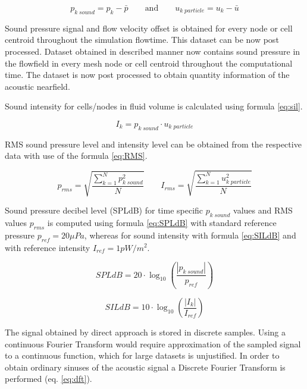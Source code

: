 \begin{equation} \label{eq:off}
p_{k \; sound} = p_k - \bar{p} \qquad \text{and} \qquad u_{k \; particle} = u_k - \bar{u}
\end{equation}

Sound pressure signal and flow velocity offset is obtained for every node or cell centroid throughout the simulation flowtime. This dataset can be now post processed. Dataset obtained in described manner now contains sound pressure in the flowfield in every mesh node or cell centroid throughout the computational time. The dataset is now post processed to obtain quantity information of the acoustic nearfield. 

Sound intensity for cells/nodes in fluid volume is calculated using formula \ref{eq:sil}. 

\begin{equation} \label{eq:sil}
I_{k} = p_{k \; sound} \cdot u_{k \; particle}
\end{equation}

RMS sound pressure level and intensity level can be obtained from the respective data with use of the formula \ref{eq:RMS}.

\begin{equation} \label{eq:RMS}
p_{rms} = \sqrt{\frac{\sum_{k=1}^{N} p_{k \; sound}^{2}}{N}} \qquad I_{rms} = \sqrt{\frac{\sum_{k=1}^{N} u_{k \; particle}^{2}}{N}}
\end{equation}

Sound pressure decibel level (SPLdB) for time specific $p_{k \; sound}$ values and RMS values $p_{rms}$ is computed using formula \ref{eq:SPLdB} with standard reference pressure $p_{ref} = 20 \mu Pa$, whereas for sound intensity with formula \ref{eq:SILdB} and with reference intensity $I_{ref} = 1 pW/m^{2}$.

\begin{equation} \label{eq:SPLdB}
SPLdB = 20 \cdot \log_{10}\left(\frac{|p_{k \; sound}|}{p_{ref}}\right)
\end{equation}

\begin{equation} \label{eq:SILdB}
SILdB = 10 \cdot \log_{10}\left(\frac{|I_{k}|}{I_{ref}}\right)
\end{equation}

The signal obtained by direct approach is stored in discrete samples. Using a continuous Fourier Transform would require approximation of the sampled signal to a continuous function, which for large datasets is unjustified. In order to obtain ordinary sinuses of the acoustic signal a Discrete Fourier Transform is performed (eq. \ref{eq:dft}).

